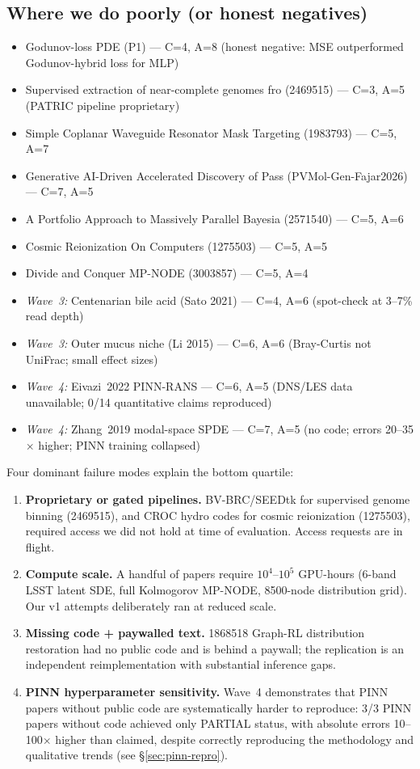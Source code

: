 \documentclass[11pt]{article}
\begin{document}
\subsection{Where we do poorly (or honest negatives)}
\begin{itemize}[leftmargin=1.4em,itemsep=0.2em,topsep=0.2em]
\item Godunov-loss PDE (P1) --- C=4, A=8 (honest negative: MSE outperformed Godunov-hybrid loss for MLP)
\item Supervised extraction of near-complete genomes fro (2469515) --- C=3, A=5 (PATRIC pipeline proprietary)
\item Simple Coplanar Waveguide Resonator Mask Targeting (1983793) --- C=5, A=7
\item Generative AI-Driven Accelerated Discovery of Pass (PVMol-Gen-Fajar2026) --- C=7, A=5
\item A Portfolio Approach to Massively Parallel Bayesia (2571540) --- C=5, A=6
\item Cosmic Reionization On Computers (1275503) --- C=5, A=5
\item Divide and Conquer MP-NODE (3003857) --- C=5, A=4
\item \textit{Wave~3:} Centenarian bile acid (Sato 2021) --- C=4, A=6 (spot-check at 3--7\% read depth)
\item \textit{Wave~3:} Outer mucus niche (Li 2015) --- C=6, A=6 (Bray-Curtis not UniFrac; small effect sizes)
\item \textit{Wave~4:} Eivazi~2022 PINN-RANS --- C=6, A=5 (DNS/LES data unavailable; 0/14 quantitative claims reproduced)
\item \textit{Wave~4:} Zhang~2019 modal-space SPDE --- C=7, A=5 (no code; errors 20--35$\times$ higher; PINN training collapsed)
\end{itemize}

\noindent Four dominant failure modes explain the bottom quartile:
\begin{enumerate}
\item \textbf{Proprietary or gated pipelines.} BV-BRC/SEEDtk for supervised
genome binning (2469515), and CROC hydro codes for cosmic reionization
(1275503), required access we did not hold at time of evaluation. Access
requests are in flight.
\item \textbf{Compute scale.} A handful of papers require $10^4$--$10^5$
GPU-hours (6-band LSST latent SDE, full Kolmogorov MP-NODE, 8500-node
distribution grid). Our v1 attempts deliberately ran at reduced scale.
\item \textbf{Missing code + paywalled text.} 1868518 Graph-RL distribution
restoration had no public code and is behind a paywall; the replication is an
independent reimplementation with substantial inference gaps.
\item \textbf{PINN hyperparameter sensitivity.} Wave~4 demonstrates that PINN
papers without public code are systematically harder to reproduce: 3/3 PINN
papers without code achieved only PARTIAL status, with absolute errors
10--100$\times$ higher than claimed, despite correctly reproducing the
methodology and qualitative trends (see \S\ref{sec:pinn-repro}).
\end{enumerate}
\end{document}
